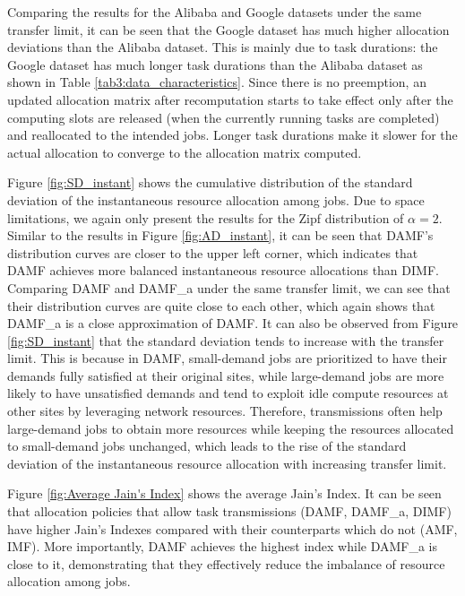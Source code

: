 Comparing the results for the Alibaba and Google datasets under the same transfer limit, it can be seen that the Google dataset has much higher allocation deviations than the Alibaba dataset. This is mainly due to task durations: the Google dataset has much longer task durations than the Alibaba dataset as shown in Table \ref{tab3:data_characteristics}. Since there is no preemption, an updated allocation matrix after recomputation starts to take effect only after the computing slots are released (when the currently running tasks are completed) and reallocated to the intended jobs. Longer task durations make it slower for the actual allocation to converge to the allocation matrix computed.

Figure \ref{fig:SD_instant} shows the cumulative distribution of the standard deviation of the instantaneous resource allocation among jobs. Due to space limitations, we again only present the results for the Zipf distribution of $\alpha = 2$. Similar to the results in Figure \ref{fig:AD_instant}, it can be seen that DAMF’s distribution curves are closer to the upper left corner, which indicates that DAMF achieves more balanced instantaneous resource allocations than DIMF. Comparing DAMF and DAMF\_a under the same transfer limit, we can see that their distribution curves are quite close to each other, which again shows that DAMF\_a is a close approximation of DAMF. It can also be observed from Figure \ref{fig:SD_instant} that the standard deviation tends to increase with the transfer limit. This is because in DAMF, small-demand jobs are prioritized to have their demands fully satisfied at their original sites, while large-demand jobs are more likely to have unsatisfied demands and tend to exploit idle compute resources at other sites by leveraging network resources. Therefore, transmissions often help large-demand jobs to obtain more resources while keeping the resources allocated to small-demand jobs unchanged, which leads to the rise of the standard deviation of the instantaneous resource allocation with increasing transfer limit.

Figure \ref{fig:Average Jain's Index} shows the average Jain's Index. It can be seen that allocation policies that allow task transmissions (DAMF, DAMF\_a, DIMF) have higher Jain's Indexes compared with their counterparts which do not (AMF, IMF). More importantly, DAMF achieves the highest index while DAMF\_a is close to it, demonstrating that they effectively reduce the imbalance of resource allocation among jobs.

